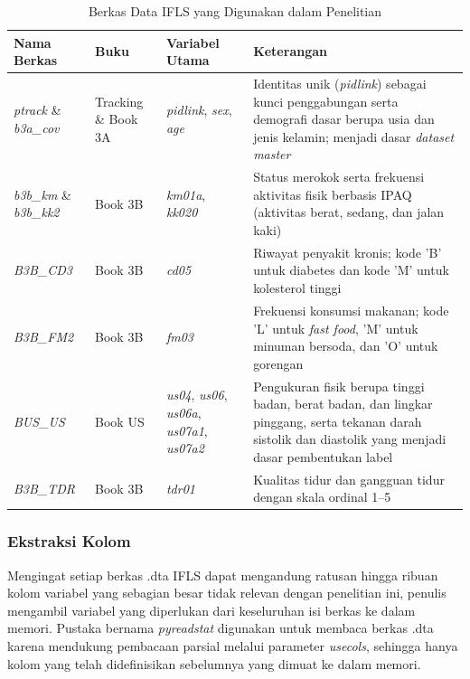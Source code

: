 \begin{table}[htbp]
    \centering
    \caption{Berkas Data IFLS yang Digunakan dalam Penelitian}
    \label{tab:ifls_files}
    \begin{tabularx}{\textwidth}{|l|l|X|X|}
        \hline
        \textbf{Nama Berkas} & \textbf{Buku} & \textbf{Variabel Utama} & \textbf{Keterangan} \\
        \hline
        \textit{ptrack} \& \textit{b3a\_cov} & Tracking \& Book 3A & \textit{pidlink}, \textit{sex}, \textit{age} & Identitas unik (\textit{pidlink}) sebagai kunci penggabungan serta demografi dasar berupa usia dan jenis kelamin; menjadi dasar \emph{dataset master} \\
        \hline
        \textit{b3b\_km} \& \textit{b3b\_kk2} & Book 3B & \textit{km01a}, \textit{kk020} & Status merokok serta frekuensi aktivitas fisik berbasis IPAQ (aktivitas berat, sedang, dan jalan kaki) \\
        \hline
        \textit{B3B\_CD3} & Book 3B & \textit{cd05} & Riwayat penyakit kronis; kode 'B' untuk diabetes dan kode 'M' untuk kolesterol tinggi \\
        \hline
        \textit{B3B\_FM2} & Book 3B & \textit{fm03} & Frekuensi konsumsi makanan; kode 'L' untuk \emph{fast food}, 'M' untuk minuman bersoda, dan 'O' untuk gorengan \\
        \hline
        \textit{BUS\_US} & Book US & \textit{us04}, \textit{us06}, \textit{us06a}, \textit{us07a1}, \textit{us07a2} & Pengukuran fisik berupa tinggi badan, berat badan, dan lingkar pinggang, serta tekanan darah sistolik dan diastolik yang menjadi dasar pembentukan label \\
        \hline
        \textit{B3B\_TDR} & Book 3B & \textit{tdr01} & Kualitas tidur dan gangguan tidur dengan skala ordinal 1--5 \\
        \hline
    \end{tabularx}
\end{table}

\subsubsection{Ekstraksi Kolom}
Mengingat setiap berkas .dta IFLS dapat mengandung ratusan hingga ribuan kolom variabel yang sebagian besar tidak relevan dengan penelitian ini, penulis mengambil variabel yang diperlukan dari keseluruhan isi berkas ke dalam memori. Pustaka bernama \textit{pyreadstat} digunakan untuk membaca berkas .dta karena mendukung pembacaan parsial melalui parameter \textit{usecols}, sehingga hanya kolom yang telah didefinisikan sebelumnya yang dimuat ke dalam memori.

